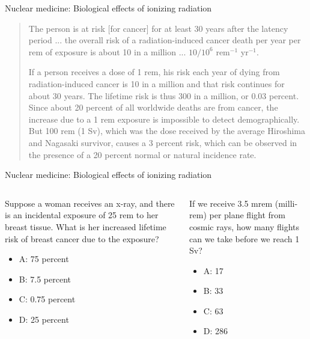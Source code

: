\documentclass{beamer}
\begin{document}
\begin{frame}{Nuclear medicine: Biological effects of ionizing radiation}
\footnotesize
\begin{quotation}
The person is at risk [for cancer] for at least 30 years after the latency period ... the overall risk of a radiation-induced cancer death per year per rem of exposure is about 10 in a million ... $10/10^6$ rem$^{-1}$ yr$^{-1}$.

If a person receives a dose of 1 rem, his risk each year of dying from radiation-induced cancer is 10 in a million and that risk continues for about 30 years. The lifetime risk is thus 300 in a million, or 0.03 percent. Since about 20 percent of all worldwide deaths are from cancer, the increase due to a 1 rem exposure is impossible to detect demographically. But 100 rem (1 Sv), which was the dose received by the average Hiroshima and Nagasaki survivor, causes a 3 percent risk, which can be observed in the presence of a 20 percent normal or natural incidence rate.
\end{quotation}
\end{frame}

\begin{frame}{Nuclear medicine: Biological effects of ionizing radiation}
\small
\begin{columns}[T]
\begin{column}{0.5\textwidth}
Suppose a woman receives an x-ray, and there is an incidental exposure of 25 rem to her breast tissue.  What is her increased lifetime risk of breast cancer due to the exposure?
\begin{itemize}
\item A: 75 percent
\item B: 7.5 percent
\item C: 0.75 percent
\item D: 25 percent
\end{itemize}
\end{column}
\begin{column}{0.5\textwidth}
If we receive 3.5 mrem (milli-rem) per plane flight from cosmic rays, how many flights can we take before we reach 1 Sv?
\begin{itemize}
\item A: 17
\item B: 33
\item C: 63
\item D: 286
\end{itemize}
\end{column}
\end{columns}
\end{frame}
\end{document}
